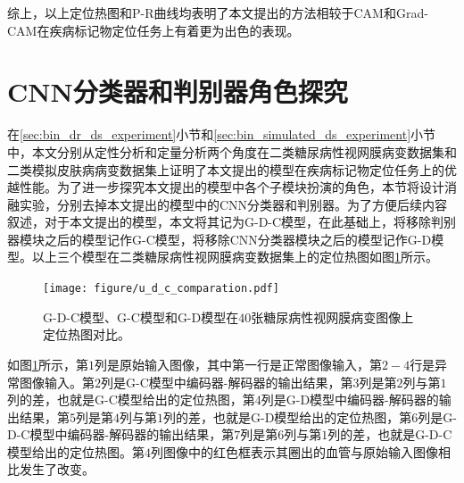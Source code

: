综上，以上定位热图和P-R曲线均表明了本文提出的方法相较于CAM和Grad-CAM在疾病标记物定位任务上有着更为出色的表现。
\section{CNN分类器和判别器角色探究}\label{sec:g_c_g_d_g_d_c_comparsion}
在\ref{sec:bin_dr_ds_experiment}小节和\ref{sec:bin_simulated_ds_experiment}小节中，本文分别从定性分析和定量分析两个角度在二类糖尿病性视网膜病变数据集和二类模拟皮肤病病变数据集上证明了本文提出的模型在疾病标记物定位任务上的优越性能。为了进一步探究本文提出的模型中各个子模块扮演的角色，本节将设计消融实验，分别去掉本文提出的模型中的CNN分类器和判别器。为了方便后续内容叙述，对于本文提出的模型，本文将其记为G-D-C模型，在此基础上，将移除判别器模块之后的模型记作G-C模型，将移除CNN分类器模块之后的模型记作G-D模型。以上三个模型在二类糖尿病性视网膜病变数据集上的定位热图如图\ref{fig:u_d_c_comparation}所示。
\begin{figure}[h]
	\centering
	\texttt{[image: figure/u\_d\_c\_comparation.pdf]}
	\caption[G-D-C模型、G-C模型和G-D模型定位热图对比]{G-D-C模型、G-C模型和G-D模型在$40$张糖尿病性视网膜病变图像上定位热图对比。} 
	\label{fig:u_d_c_comparation}
\end{figure}

如图\ref{fig:u_d_c_comparation}所示，第$1$列是原始输入图像，其中第一行是正常图像输入，第$2-4$行是异常图像输入。第$2$列是G-C模型中编码器-解码器的输出结果，第$3$列是第$2$列与第$1$列的差，也就是G-C模型给出的定位热图，第$4$列是G-D模型中编码器-解码器的输出结果，第$5$列是第$4$列与第$1$列的差，也就是G-D模型给出的定位热图，第$6$列是G-D-C模型中编码器-解码器的输出结果，第$7$列是第$6$列与第$1$列的差，也就是G-D-C模型给出的定位热图。第$4$列图像中的红色框表示其圈出的血管与原始输入图像相比发生了改变。

